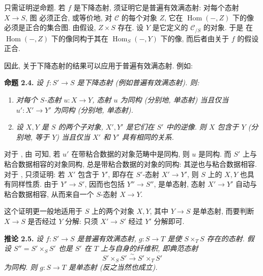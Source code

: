 只需证明逆命题. 若 \(f\) 是下降态射, 须证明它是普遍有效满态射:
对每个态射 \(X\to S\), 图
 必须正合,
或等价地, 对 \(\mathscr C\) 的每个对象 \(Z\),
它在 \(\operatorname{Hom}(-,Z)\) 下的像必须是正合的集合图.
由假设, \(Z\times S\) 存在. 设 \(Y\) 是它定义的
\(\mathscr C_{/S}\) 的对象. 于是
 在
\(\operatorname{Hom}(-,Z)\) 下的像同构于其在
\(\operatorname{Hom}_S(-,Y)\) 下的像, 而后者由关于 \(f\) 的假设正合.

因此, 关于下降态射的结果可以应用于普遍有效满态射. 例如:

\medskip
\noindent{}\textbf{命题 2.4.}
\textit{设 \(f:S'\to S\) 是下降态射 (例如普遍有效满态射). 则:}
\begin{enumerate}
  \item[(a)]
    \textit{对每个 \(S\)-态射 \(u:X\to Y\), 态射 \(u\) 为同构
    (分别地, 单态射) 当且仅当 \(u':X'\to Y'\) 为同构 (分别地, 单态射).}
  \item[(b)]
    \textit{设 \(X,Y\) 是 \(S\) 的两个子对象, \(X',Y'\) 是它们在
    \(S'\) 中的逆像. 则 \(X\) 包含于 \(Y\) (分别地, 等于 \(Y\))
    当且仅当 \(X'\) 和 \(Y'\) 具有相同的关系.}
\end{enumerate}

对于 ,
由  可知,
若 \(u'\) 在带粘合数据的对象范畴中是同构, 则 \(u\) 是同构.
而 \(S'\) 上与粘合数据相容的对象同构, 总是带粘合数据的对象的同构:
其逆也与粘合数据相容. 对于
,
只须证明: 若 \(X'\) 包含于 \(Y'\), 即存在 \(S'\)-态射
\(X'\to Y'\), 则 \(S\) 上的 \(X,Y\) 也具有同样性质.
由于 \(Y'\to S'\), 因而也包括 \(Y''\to S''\), 是单态射,
态射 \(X'\to Y'\) 自动与粘合数据相容, 从而来自一个
\(S\)-态射 \(X\to Y\).

这个证明更一般地适用于 \(S\) 上的两个对象 \(X,Y\),
其中 \(Y\to S\) 是单态射, 而要判断 \(X\to S\) 是否经过 \(Y\) 分解:
只须 \(X'\to S'\) 经过 \(Y'\) 分解即可.

\medskip
\noindent{}\textbf{推论 2.5.}
\textit{设 \(f:S'\to S\) 是普遍有效满态射, \(g:S\to T\)
是使 \(S\times_TS\) 存在的态射. 假设 \(S''=S'\times_SS'\)
也是 \(S'\) 在 \(T\) 上与自身的纤维积, 即典范态射}
\[
  S'\times_SS'\xrightarrow{\sim}S'\times_TS'
\]
\textit{为同构. 则 \(g:S\to T\) 是单态射 (反之当然也成立).}

